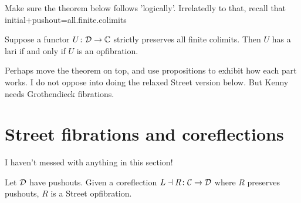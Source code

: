 \documentclass{amsart}
\begin{document}
{\chris Make sure the theorem below follows 'logically'. Irrelatedly to that, recall that initial+pushout=all.finite.colimits}
\begin{thm}\label{thm:mainthm}
 Suppose a functor $U\colon\mathcal{D}\to\mathbb{C}$ strictly preserves all finite colimits. Then $U$ has a lari if and only if $U$
is an opfibration.
\end{thm}
{\chris Perhaps move the theorem on top, and use propositions to exhibit how each part works. I do not oppose into
doing the relaxed Street version below. But Kenny needs Grothendieck fibrations.}


\section{Street fibrations and coreflections}


{\chris I haven't messed with anything in this section!}
\begin{thm}
	Let $ \mathcal{D} $ have pushouts. Given a coreflection $ L \dashv R \colon \mathcal{C} \to \mathcal{D} $ where $ R $ preserves pushouts, $ R $ is a Street opfibration.
\end{thm}
\end{document}

